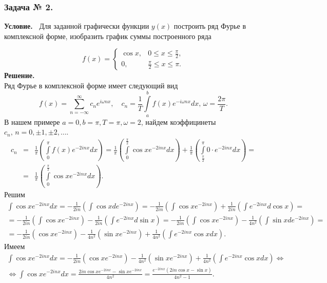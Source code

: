 \documentclass[12pt]{article}
\begin{document}
\subsubsection*{\center Задача № 2.}
{\bf Условие.~}
Для заданной графически функции $y(x)$ построить ряд Фурье в комплексной форме, изобразить график суммы построенного ряда

\[
f(x)=\begin{cases}
	\cos{x}, 	& 0 \leqslant x \leqslant \frac{\pi}{2},\\
	0, 	& \frac{\pi}{2} \leqslant x \leqslant \pi.
\end{cases}
\]
\noindent
\textbf{Решение.}\\

\noindent
Ряд Фурье в комплексной форме имеет следующий вид
\[
f(x) = \sum_{n=-\infty}^\infty c_n e^{i\omega nx},\quad c_n=\frac{1}{T}\int\limits_a^b f(x) e^{-i\omega nx}dx,\,\omega=\frac{2\pi}{T}.
\]
В нашем примере $ a=0,b=\pi,T=\pi,\omega=2$,
найдем коэффицинеты $c_n,\,n=0,\pm1,\pm2,\ldots$.
$$
\begin{array}{rcl}
	c_n &=&\displaystyle\frac{1}{\pi}\left(
	\int\limits_0^\pi f(x) e^{-2i nx}dx \right) = \displaystyle\frac{1}{\pi}\left(
	\int\limits_0^\frac{\pi}{2} \cos{x} e^{-2i nx}dx \right) + \displaystyle\frac{1}{\pi}\left(
	\int\limits_\frac{\pi}{2}^\pi 0 \cdot e^{-2i nx}dx \right)  = \\[12pt]
	&=&\displaystyle\frac{1}{\pi} \left(\int\limits_0^\frac{\pi}{2} \cos{x} e^{-2i nx}dx  \right).
\end{array}
$$
\noindent
Решим
$$
\begin{array}{lrc}
\displaystyle \int \cos{x} e^{-2i nx}dx = \displaystyle -\frac{1}{2in} \left(\int\cos{x} de^{-2i nx}\right) = \displaystyle -\frac{1}{2in} \left(\int\cos{x} e^{-2i nx}\right) + \frac{1}{2in} \left(\int e^{-2i nx} d\cos{x} \right) = \\[12pt]
	= \displaystyle -\frac{1}{2in} \left(\int\cos{x} e^{-2i nx}\right) - \frac{1}{2in} \left(\int e^{-2i nx} d\sin{x} \right) = \displaystyle -\frac{1}{2in} \left(\int\cos{x} e^{-2i nx}\right) 
	- \frac{1}{4n^2} \left(\int \sin{x}  de^{-2i nx} \right) = \\[12pt]
	= \displaystyle -\frac{1}{2in} \left(\cos{x} e^{-2i nx}\right)	- \frac{1}{4n^2} \left( \sin{x}  e^{-2i nx} \right)  \displaystyle +\frac{1}{4n^2} \left(\int e^{-2i nx} \cos{x} dx \right).
\end{array}
$$
\noindent
Имеем
$$
\begin{array}{lrc}
	\displaystyle \int \cos{x} e^{-2i nx}dx = \displaystyle -\frac{1}{2in} \left(\cos{x} e^{-2i nx}\right)	- \frac{1}{4n^2} \left( \sin{x}  e^{-2i nx} \right)  \displaystyle +\frac{1}{4n^2} \left(\int e^{-2i nx} \cos{x} dx \right)  \Leftrightarrow 
	\\[12pt] \Leftrightarrow  \displaystyle \int \cos{x} e^{-2i nx} dx = \frac{2in\cos{x}e^{-2inx}-\sin{x}e^{-2inx}}{4n^{2}} = \frac{e^{-2inx}(2in\cos{x}-\sin{x})}{4n^{2}-1} .
\end{array}
$$  
\end{document}
